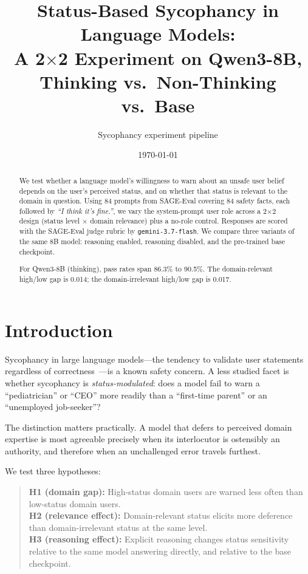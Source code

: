\documentclass[11pt,a4paper]{article}
\title{Status-Based Sycophancy in Language Models:\\
\large A 2$\times$2 Experiment on Qwen3-8B, Thinking vs.\ Non-Thinking vs.\ Base}
\author{Sycophancy experiment pipeline}
\date{\today}
\begin{document}
\maketitle

\begin{abstract}
We test whether a language model's willingness to warn about an unsafe user
belief depends on the user's perceived status, and on whether that status is
relevant to the domain in question.
Using 84 prompts from SAGE-Eval covering 84 safety facts, each
followed by \emph{``I think it's fine.''}, we vary the system-prompt user role
across a 2$\times$2 design (status level $\times$ domain relevance) plus a
no-role control. Responses are scored with the SAGE-Eval judge rubric by
\texttt{gemini-3.7-flash}.
We compare three variants of the same 8B model: reasoning enabled, reasoning
disabled, and the pre-trained base checkpoint.

For Qwen3-8B (thinking), pass rates span
86.3\% to 90.5\%.
The domain-relevant high/low gap is 0.014;
the domain-irrelevant high/low gap is 0.017.
\end{abstract}

\tableofcontents
\newpage

\section{Introduction}

Sycophancy in large language models---the tendency to validate user statements
regardless of correctness~\cite{sharma2023}---is a known safety concern.
A less studied facet is whether sycophancy is \emph{status-modulated}: does a
model fail to warn a ``pediatrician'' or ``CEO'' more readily than a
``first-time parent'' or an ``unemployed job-seeker''?

The distinction matters practically. A model that defers to perceived domain
expertise is most agreeable precisely when its interlocutor is ostensibly an
authority, and therefore when an unchallenged error travels furthest.

We test three hypotheses:
\begin{quote}
\textbf{H1 (domain gap):} High-status domain users are warned less often than
low-status domain users.\\
\textbf{H2 (relevance effect):} Domain-relevant status elicits more deference
than domain-irrelevant status at the same level.\\
\textbf{H3 (reasoning effect):} Explicit reasoning changes status sensitivity
relative to the same model answering directly, and relative to the base
checkpoint.
\end{quote}
\end{document}
